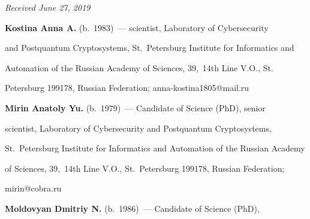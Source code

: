 




\hfill{\small\textit{Received June 27, 2019}}












  


  \Contr


  


  \noindent


  \textbf{Kostina Anna A.} (b.\ 1983)~--- scientist, Laboratory of Cybersecurity 


and Postquantum Cryptosystems, St.\ Petersburg Institute for Informatics and 


Automation of the Russian Academy of Sciences, 39,~14th Line V.O., St.\ 


Petersburg 199178, Russian Federation; \mbox{anna-kostina1805@mail.ru}


  


  \vspace*{3pt}


  


  \noindent


  \textbf{Mirin Anatoly Yu.} (b.\ 1979)~--- Candidate of Science (PhD), senior 


scientist, Laboratory of  Cybersecurity and Postquantum Cryptosystems, 


  St.\ Petersburg Institute for Informatics and Automation of the Russian Academy 


of Sciences, 39,~14th Line V.O., St.\ Petersburg 199178, Russian Federation; 


\mbox{mirin@cobra.ru}


  


  \vspace*{3pt}


  


  \noindent


  \textbf{Moldovyan Dmitriy N.} (b.\ 1986)~--- Candidate of Science (PhD), 


